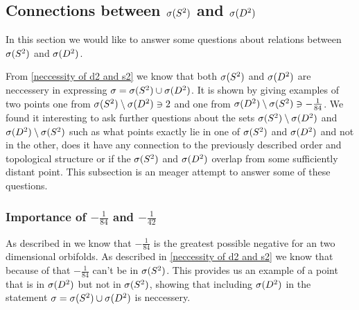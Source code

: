 \subsection{Connections between ${{\sigma}(S^2)}$ and ${{\sigma}(D^2)}$}\label{D_and_S}
In this section we would like to 
answer some questions about 
relations between ${{\sigma}(S^2)}$ and ${{\sigma}(D^2)}$. 

From \ref{neccessity of d2 and s2} we know that both ${{\sigma}(S^2)}$ and ${{\sigma}(D^2)}$ are neccessery 
in expressing ${\sigma} = {{\sigma}(S^2)} \cup {{\sigma}(D^2)}$. It is shown by giving examples of two points 
one from ${{\sigma}(S^2)} \setminus {{\sigma}(D^2)} \ni 2$ and one from ${{\sigma}(D^2)} \setminus {{\sigma}(S^2)} \ni -\frac{1}{84}$.
We found it interesting to ask further questions about the sets  
${{\sigma}(S^2)} \setminus {{\sigma}(D^2)}$ and ${{\sigma}(D^2)} \setminus {{\sigma}(S^2)}$ such as what points 
exactly lie in one of ${{\sigma}(S^2)}$ and ${{\sigma}(D^2)}$ and not in the other, does it have 
any connection to the previously described order and topological structure 
or if the ${{\sigma}(S^2)}$ and ${{\sigma}(D^2)}$ 
overlap from some sufficiently distant point. This subsection is an meager attempt to 
answer some of these questions.
\subsubsection{Importance of $-\frac{1}{84}$ and $-\frac{1}{42}$}
As described in \cite{greatest negative orbifold} we know that $-\frac{1}{84}$ is 
the greatest possible negative \Eoc for an two dimensional orbifolds. 
As described in \ref{neccessity of d2 and s2} 
we know that because of that $-\frac{1}{84}$ can't be in ${{\sigma}(S^2)}$. 
This provides us an example of a point that is in ${{\sigma}(D^2)}$ but not in ${{\sigma}(S^2)}$, showing that 
including ${{\sigma}(D^2)}$ in the statement ${\sigma} = {{\sigma}(S^2)} \cup {{\sigma}(D^2)}$ is neccessery.






